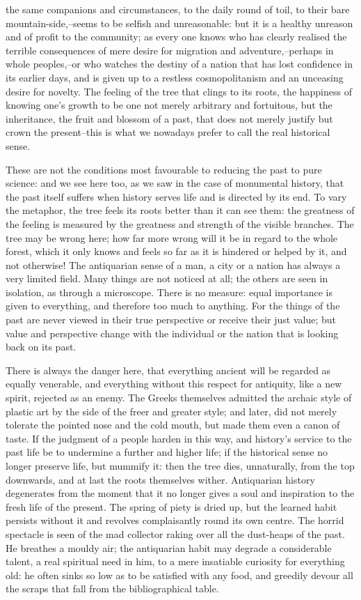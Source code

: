 the same companions and circumstances, to the daily round of toil, to
their bare mountain-side,--seems to be selfish and unreasonable: but
it is a healthy unreason and of profit to the community; as every one
knows who has clearly realised the terrible consequences of mere
desire for migration and adventure,--perhaps in whole peoples,--or
who watches the destiny of a nation that has lost confidence in its
earlier days, and is given up to a restless cosmopolitanism and an
unceasing desire for novelty. The feeling of the tree that clings to
its roots, the happiness of knowing one's growth to be one not merely
arbitrary and fortuitous, but the inheritance, the fruit and blossom
of a past, that does not merely justify but crown the present--this
is what we nowadays prefer to call the real historical sense.

These are not the conditions most favourable to reducing the past to
pure science: and we see here too, as we saw in the case of
monumental history, that the past itself suffers when history serves
life and is directed by its end. To vary the metaphor, the tree feels
its roots better than it can see them: the greatness of the feeling
is measured by the greatness and strength of the visible branches.
The tree may be wrong here; how far more wrong will it be in regard
to the whole forest, which it only knows and feels so far as it is
hindered or helped by it, and not otherwise! The antiquarian sense of
a man, a city or a nation has always a very limited field. Many
things are not noticed at all; the others are seen in isolation, as
through a microscope. There is no measure: equal importance is given
to everything, and therefore too much to anything. For the things of
the past are never viewed in their true perspective or receive their
just value; but value and perspective change with the individual or
the nation that is looking back on its past.

There is always the danger here, that everything ancient will be
regarded as equally venerable, and everything without this respect
for antiquity, like a new spirit, rejected as an enemy. The Greeks
themselves admitted the archaic style of plastic art by the side of
the freer and greater style; and later, did not merely tolerate the
pointed nose and the cold mouth, but made them even a canon of taste.
If the judgment of a people harden in this way, and history's service
to the past life be to undermine a further and higher life; if the
historical sense no longer preserve life, but mummify it: then the
tree dies, unnaturally, from the top downwards, and at last the roots
themselves wither. Antiquarian history degenerates from the moment
that it no longer gives a soul and inspiration to the fresh life of
the present. The spring of piety is dried up, but the learned habit
persists without it and revolves complaisantly round its own centre.
The horrid spectacle is seen of the mad collector raking over all the
dust-heaps of the past. He breathes a mouldy air; the antiquarian
habit may degrade a considerable talent, a real spiritual need in
him, to a mere insatiable curiosity for everything old: he often
sinks so low as to be satisfied with any food, and greedily devour
all the scraps that fall from the bibliographical table.

